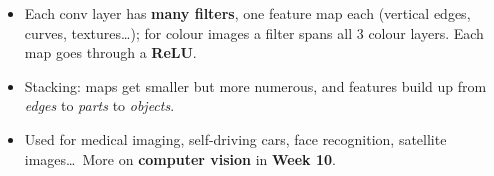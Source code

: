 \documentclass[10pt]{beamer}
\begin{document}
\begin{frame}[fragile]
\vspace{6pt}
\begin{itemize}
\item Each conv layer has \textbf{many filters}, one feature map each
  (vertical edges, curves, textures\dots); for colour images a filter spans
  all 3 colour layers. Each map goes through a \textbf{ReLU}.
\item Stacking: maps get smaller but more numerous, and features build up
  from \emph{edges} to \emph{parts} to \emph{objects}.
\item[$\Rightarrow$] Used for medical imaging, self-driving cars, face
  recognition, satellite images\dots\ More on \textbf{computer vision} in
  \textbf{Week 10}.
\end{itemize}

\end{frame}
\end{document}
